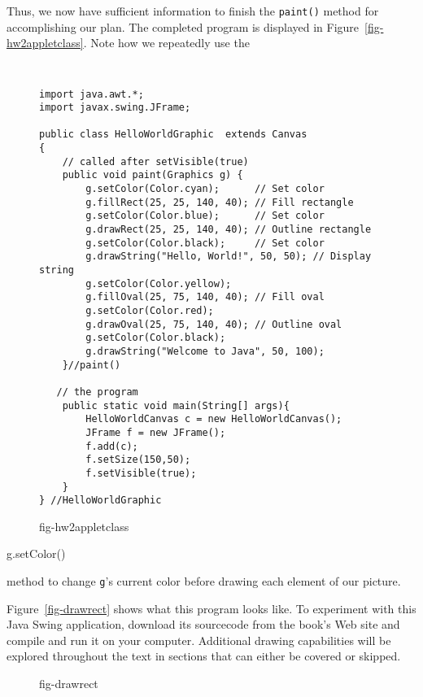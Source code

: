 Thus, we now have sufficient information to finish the {\tt paint()}
method for accomplishing our plan.  The completed program is displayed
in Figure~\ref{fig-hw2appletclass}. Note how we repeatedly use the {\tt
\begin{figure}[!htb]
\jjjprogstart
\begin{jjjlisting}
\begin{lstlisting}
import java.awt.*;
import javax.swing.JFrame;

public class HelloWorldGraphic  extends Canvas 
{ 
    // called after setVisible(true)
    public void paint(Graphics g) { 
        g.setColor(Color.cyan);      // Set color
        g.fillRect(25, 25, 140, 40); // Fill rectangle
        g.setColor(Color.blue);      // Set color
        g.drawRect(25, 25, 140, 40); // Outline rectangle
        g.setColor(Color.black);     // Set color
        g.drawString("Hello, World!", 50, 50); // Display string
        g.setColor(Color.yellow);          
        g.fillOval(25, 75, 140, 40); // Fill oval
        g.setColor(Color.red);
        g.drawOval(25, 75, 140, 40); // Outline oval
        g.setColor(Color.black);
        g.drawString("Welcome to Java", 50, 100);
    }//paint()

   // the program
    public static void main(String[] args){
        HelloWorldCanvas c = new HelloWorldCanvas();
        JFrame f = new JFrame();
        f.add(c);
        f.setSize(150,50);
        f.setVisible(true);
    }
} //HelloWorldGraphic
\end{lstlisting}
\end{jjjlisting}
{fig-hw2appletclass}
\end{figure}
g.setColor()} method to change {\tt g}'s current color before drawing
each element of our picture. 

Figure~\ref{fig-drawrect} shows what this program looks like.  
To experiment with this Java Swing application, download its sourcecode
from the book's Web site and compile
and run it on your computer. Additional drawing capabilities will
be explored throughout the text in sections that can either be covered
or skipped.

\begin{figure}[!bht]
\figaleftscaled{chptr02/drawrect.eps}{0.8}{This is how the {\tt HelloWorldGraphic}
program will look when run.
} {fig-drawrect}

\end{figure}

